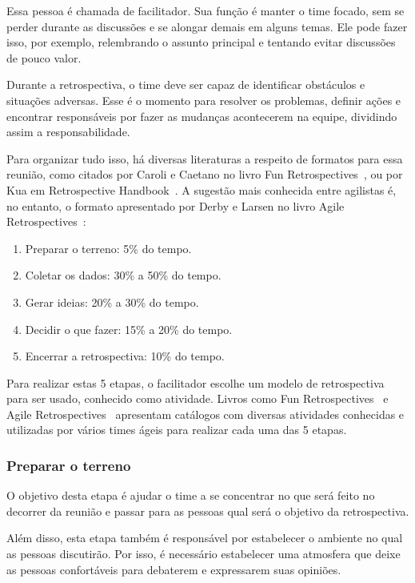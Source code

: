 Essa pessoa é chamada de facilitador. Sua função é manter o time focado, sem se perder durante as discussões e se alongar demais em alguns temas. Ele pode fazer isso, por exemplo, relembrando o assunto principal e tentando evitar discussões de pouco valor.

Durante a retrospectiva, o time deve ser capaz de identificar obstáculos e situações adversas. Esse é o momento para resolver os problemas, definir ações e encontrar responsáveis por fazer as mudanças acontecerem na equipe, dividindo assim a responsabilidade.

Para organizar tudo isso, há diversas literaturas a respeito de formatos para essa reunião, como citados por Caroli e Caetano no livro Fun Retrospectives~\cite{funRetrospectives}, ou por Kua em Retrospective Handbook~\cite{handRetrospectives}. A sugestão mais conhecida entre agilistas é, no entanto, o formato apresentado por Derby e Larsen no livro Agile Retrospectives~\cite{retrospectives}:

\begin{enumerate}
	\item Preparar o terreno: 5\% do tempo.
	\item Coletar os dados: 30\% a 50\% do tempo.
	\item Gerar ideias: 20\% a 30\% do tempo.
	\item Decidir o que fazer: 15\% a 20\% do tempo.
	\item Encerrar a retrospectiva: 10\% do tempo.
\end{enumerate}

Para realizar estas 5 etapas, o facilitador escolhe um modelo de retrospectiva para ser usado, conhecido como atividade. Livros como Fun Retrospectives~\cite{funRetrospectives} e Agile Retrospectives~\cite{retrospectives} apresentam catálogos com diversas atividades conhecidas e utilizadas por vários times ágeis para realizar cada uma das 5 etapas.

\subsubsection*{Preparar o terreno}

O objetivo desta etapa é ajudar o time a se concentrar no que será feito no decorrer da reunião e passar para as pessoas qual será o objetivo da retrospectiva.

Além disso, esta etapa também é responsável por estabelecer o ambiente no qual as pessoas discutirão. Por isso, é necessário estabelecer uma atmosfera que deixe as pessoas confortáveis para debaterem e expressarem suas opiniões.

